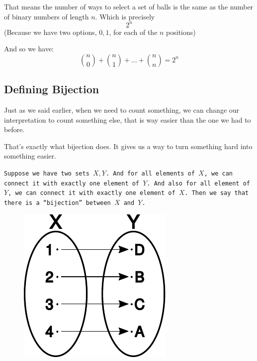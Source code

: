 \documentclass[compress]{beamer}
\begin{document}
\begin{frame}
    That means the number of ways to select a set of balls is the same as the
    number of binary numbers of length $n$. Which is precisely
    \[\boxed{2^n}\]
    (Because we have two options, $0, 1$, for each of the $n$ positions)
    \pause \vspace{1em}

    And so we have:
    \[{n \choose 0}+{n \choose 1} + \dots  + {n \choose n}=2^n\] 
\end{frame}


\subsection{Defining Bijection}

\begin{frame}

    Just as we said earlier, when we need to count something, we can change our
    interpretation to count something else, that is way easier than the one we
    had to before.\pause
    \vspace{1em}

    That's exactly what bijection does. It gives us a way to turn something
    hard into something easier.

\end{frame}

\begin{frame}
    \texttt{Suppose we have two sets $X, Y$. And for all elements
        of $X$, we can connect it with exactly one element of $Y$. And also for
        all element of $Y$, we can connect it with exactly one element of $X$.
    Then we say that there is a ``bijection'' between $X$ and $Y$.}

    \vspace{1em}
    \begin{figure}
        \begin{center}
            \includegraphics[width=.3\linewidth]{Bijection.pdf}
        \end{center}
    \end{figure}
\end{frame}
\end{document}
